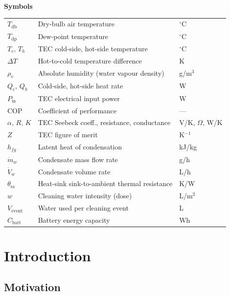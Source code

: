 \documentclass[12pt,a4paper]{report}   %
\begin{document}
\vspace{1.0em}
\noindent\textbf{Symbols}\\[0.4em]
\noindent\begin{tabular}{@{}p{2.6cm}p{9.8cm}p{2.4cm}@{}}
$T_{\mathrm{db}}$ & Dry-bulb air temperature & $^\circ$C \\
$T_{\mathrm{dp}}$ & Dew-point temperature & $^\circ$C \\
$T_c,\,T_h$ & TEC cold-side, hot-side temperature & $^\circ$C \\
$\Delta T$ & Hot-to-cold temperature difference & K \\
$\rho_v$ & Absolute humidity (water vapour density) & g/m$^3$ \\
$Q_c,\,Q_h$ & Cold-side, hot-side heat rate & W \\
$P_{\mathrm{in}}$ & TEC electrical input power & W \\
$\mathrm{COP}$ & Coefficient of performance & --- \\
$\alpha,\,R,\,K$ & TEC Seebeck coeff., resistance, conductance & V/K, $\Omega$, W/K \\
$Z$ & TEC figure of merit & K$^{-1}$ \\
$h_{fg}$ & Latent heat of condensation & kJ/kg \\
$\dot{m}_w$ & Condensate mass flow rate & g/h \\
$\dot{V}_w$ & Condensate volume rate & L/h \\
$\theta_{\mathrm{sa}}$ & Heat-sink sink-to-ambient thermal resistance & K/W \\
$w$ & Cleaning water intensity (dose) & L/m$^2$ \\
$V_{\mathrm{event}}$ & Water used per cleaning event & L \\
$C_{\mathrm{batt}}$ & Battery energy capacity & Wh \\
\end{tabular}

\cleardoublepage
{}

\chapter{Introduction}
\label{ch:intro}

\section{Motivation}
\end{document}
